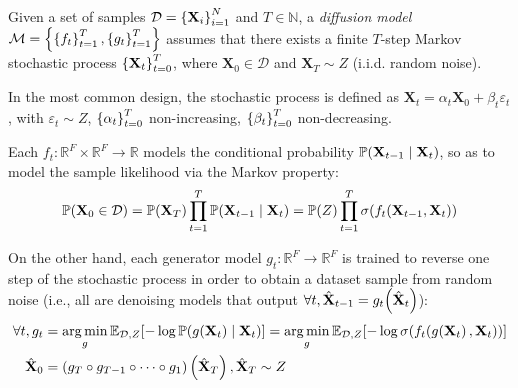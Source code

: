 \begin{definition}
    Given a set of samples $\mathcal{D}=\mathopen{}\left\{\mathbf{X}_i\right\}_{i=1}^{N}$ and $T\in\mathbb{N}$, a \emph{diffusion model} \cite{sohl-dickstein_deep_2015} $\mathcal{M}=\mathopen{}\left\{\mathopen{}\left\{f_t\right\}_{t=1}^{T},\mathopen{}\left\{g_t\right\}_{t=1}^{T}\right\}$ assumes that there exists a finite $T$-step Markov stochastic process $\mathopen{}\left\{\mathbf{X}_t\right\}_{t=0}^{T}$, where $\mathbf{X}_0 \in \mathcal{D}$ and $\mathbf{X}_T \sim Z$ (i.i.d. random noise). 

    In the most common design, the stochastic process is defined as $\mathbf{X}_t=\alpha_t \mathbf{X}_{0} + \beta_t \varepsilon_t $, with $\varepsilon_t \sim Z$, $\mathopen{}\left\{\alpha_t\right\}_{t=0}^{T}$ non-increasing, $\mathopen{}\left\{\beta_t\right\}_{t=0}^{T}$ non-decreasing.
    
    Each $f_t: \mathbb{R}^F \times \mathbb{R}^F \to \mathbb{R}$ models the conditional probability $\mathbb{P}\mathopen{}\left(\mathbf{X}_{t-1}\mid \mathbf{X}_t\right)$, so as to model the sample likelihood via the Markov property:
    \begin{equation}
    \mathbb{P}\mathopen{}\left(\mathbf{X}_0 \in \mathcal{D}\right)=\mathbb{P}\mathopen{}\left(\mathbf{X}_T\right)\prod_{t=1}^{T}{\mathbb{P}\mathopen{}\left(\mathbf{X}_{t-1} \mid \mathbf{X}_t\right)}=\mathbb{P}\mathopen{}\left(Z\right)\prod_{t=1}^{T}{\sigma\mathopen{}\left(f_t\mathopen{}\left(\mathbf{X}_{t-1}, \mathbf{X}_t\right)\right)}
    \end{equation}
    
    On the other hand, each generator model $g_t:\mathbb{R}^F \to \mathbb{R}^F$ is trained to reverse one step of the stochastic process in order to obtain a dataset sample from random noise (i.e., all are denoising models that output $\forall t, \hat{\mathbf{X}}_{t-1}=g_t\mathopen{}\left(\hat{\mathbf{X}}_t\right)$):
    \begin{align}   
    \begin{split}
    \forall t, g_t &= \operatorname*{arg\,min}_{g}{\mathbb{E}_{\mathcal{D},Z}\mathopen{}\left[-\log{\mathbb{P}\mathopen{}\left(g\mathopen{}\left(\mathbf{X}_t\right)\mid\mathbf{X}_t\right)}\right]}=\operatorname*{arg\,min}_{g}{\mathbb{E}_{\mathcal{D},Z}\mathopen{}\left[-\log{\sigma\mathopen{}\left(f_t\mathopen{}\left(g\mathopen{}\left(\mathbf{X}_t\right),\mathbf{X}_t\right)\right)}\right]} \\
    \hat{\mathbf{X}}_0 &= \mathopen{}\left(g_T \circ g_{T-1}\circ\dots\circ g_1\right)\mathopen{}\left(\hat{\mathbf{X}}_T\right),\hat{\mathbf{X}}_T\sim Z
    \end{split}
    \end{align}
\end{definition}

